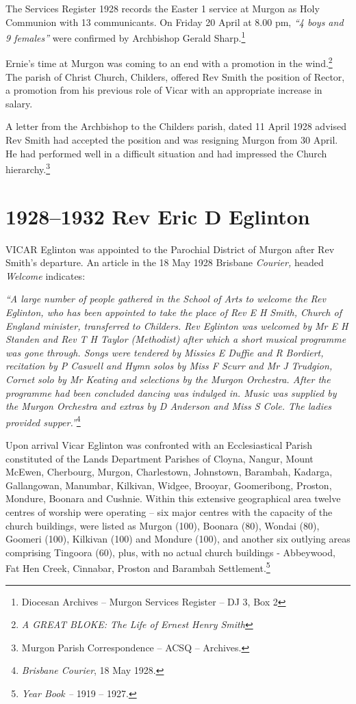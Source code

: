 The Services Register 1928 records the Easter 1 service at Murgon as Holy Communion with 13 communicants. On Friday 20 April at 8.00 pm, \emph{``4 boys and 9 females''} were confirmed by Archbishop Gerald Sharp.\footnote{Diocesan Archives -- Murgon Services Register -- DJ 3, Box 2}


Ernie's time at Murgon was coming to an end with a promotion in the wind.\footnote{\emph{A GREAT BLOKE: The Life of Ernest Henry Smith}} The parish of Christ Church, Childers, offered Rev Smith the position of Rector, a promotion from his previous role of Vicar with an appropriate increase in salary.


A letter from the Archbishop to the Childers parish, dated 11 April 1928 advised Rev Smith had accepted the position and was resigning Murgon from 30 April. He had performed well in a difficult situation and had impressed the Church hierarchy.\footnote{Murgon Parish Correspondence -- ACSQ -- Archives.}


\balance


\printendnotes[custom]
\setcounter{endnote}{0}
\chapter{1928--1932 Rev Eric D Eglinton}
\nobalance


\lettrine[lines=3]{V}{ICAR}
 Eglinton was appointed to the Parochial District of Murgon after Rev Smith's departure. An article in the 18 May 1928 Brisbane \emph{Courier,} headed \emph{Welcome} indicates:

\emph{``A large number of people gathered in the School of Arts to welcome the Rev Eglinton, who has been appointed to take the place of Rev E H Smith, Church of England minister, transferred to Childers. Rev Eglinton was welcomed by Mr E H Standen and Rev T H Taylor (Methodist) after which a short musical programme was gone through. Songs were tendered by Missies E Duffie and R Bordiert, recitation by P Caswell and Hymn solos by Miss F Scurr and Mr J Trudgion, Cornet solo by Mr Keating and selections by the Murgon Orchestra. After the programme had been concluded dancing was indulged in. Music was supplied by the Murgon Orchestra and extras by D Anderson and Miss S Cole. The ladies provided supper.''}\footnote{\emph{Brisbane Courier}, 18 May 1928.}


Upon arrival Vicar Eglinton was confronted with an Ecclesiastical Parish constituted of the Lands Department Parishes of Cloyna, Nangur, Mount McEwen, Cherbourg, Murgon, Charlestown, Johnstown, Barambah, Kadarga, Gallangowan, Manumbar, Kilkivan, Widgee, Brooyar, Goomeribong, Proston, Mondure, Boonara and Cushnie. Within this extensive geographical area twelve centres of worship were operating -- six major centres with the capacity of the church buildings, were listed as Murgon (100), Boonara (80), Wondai (80), Goomeri (100), Kilkivan (100) and Mondure (100), and another six outlying areas comprising Tingoora (60), plus, with no actual church buildings - Abbeywood, Fat Hen Creek, Cinnabar, Proston and Barambah Settlement.\footnote{\emph{Year Book --} 1919 -- 1927.}


